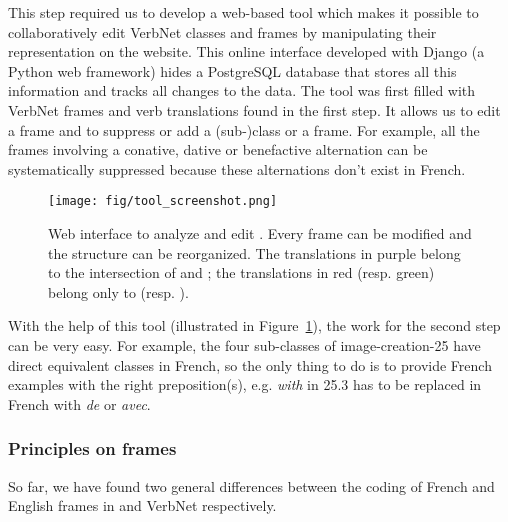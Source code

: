 This step  required us to develop a web-based tool which makes it possible to
collaboratively edit VerbNet classes and frames by manipulating their
representation on the website. This online interface developed with Django (a
Python web framework) hides a PostgreSQL database that stores all this
information and tracks all changes to the data.  The tool was first filled with
VerbNet frames and verb translations found in the first step. It allows
us to edit a frame and to suppress or add a (sub-)class or a frame. For
example, all the frames involving a conative, dative or benefactive alternation
can be systematically suppressed because these alternations don't exist in
French.

\begin{figure}
 \centering
 \texttt{[image: fig/tool\_screenshot.png]}
 \caption{\label{tool}Web interface to analyze and edit \verbenet{}. Every
    frame can be modified and the structure can be reorganized.  The translations
    in purple belong to the intersection of \Clvf{} and \Clg{}; the translations in
    red (resp. green) belong only to \Clvf{} (resp. \Clg{}).}
\end{figure}


With the help of this tool (illustrated in Figure~\ref{tool}),  the work for
the second step can be very easy. For example, the four sub-classes of
image-creation-25 have direct equivalent classes in French, so the only thing
to do is to provide French examples with the right preposition(s), e.g.
\emph{with} in 25.3 has to be replaced in French with \emph{de} or \emph{avec}.

\subsubsection{Principles on frames}\label{princp}

So far, we have found two general differences between the  coding of French and
English frames in \verbenet{} and VerbNet respectively.


